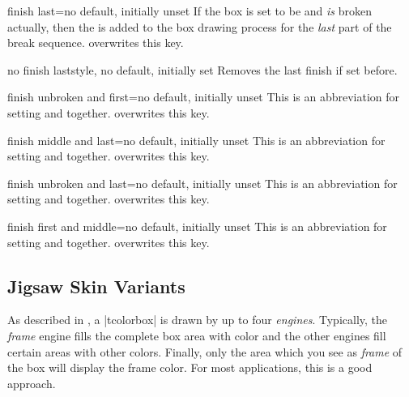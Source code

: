 \begin{docTcbKey}{finish last}{=}{no default, initially unset}
  If the box is set to be  and \emph{is} broken actually,
  then the  is added to the box drawing process for
  the \emph{last} part of the break sequence.
   overwrites this key.
\end{docTcbKey}

\begin{docTcbKey}{no finish last}{}{style, no default, initially set}
  Removes the last finish if set before.
\end{docTcbKey}

\begin{docTcbKey}{finish unbroken and first}{=}{no default, initially unset}
  This is an abbreviation for setting
   and
   together.
   overwrites this key.
\end{docTcbKey}

\begin{docTcbKey}{finish middle and last}{=}{no default, initially unset}
  This is an abbreviation for setting
   and
   together.
   overwrites this key.
\end{docTcbKey}

\begin{docTcbKey}{finish unbroken and last}{=}{no default, initially unset}
  This is an abbreviation for setting
   and
   together.
   overwrites this key.
\end{docTcbKey}


\begin{docTcbKey}[][doc new=2014-09-19]{finish first and middle}{=}{no default, initially unset}
  This is an abbreviation for setting
   and
   together.
   overwrites this key.
\end{docTcbKey}


\clearpage
\subsection{Jigsaw Skin Variants}\label{subsec:skinjigsaw}
As described in , a |tcolorbox| is drawn by up to
four \emph{engines}. Typically, the \emph{frame} engine fills the complete box area
with color and the other engines fill certain areas with other colors.
Finally, only the area which you see as \emph{frame} of the box will display
the frame color. For most applications, this is a good approach.

